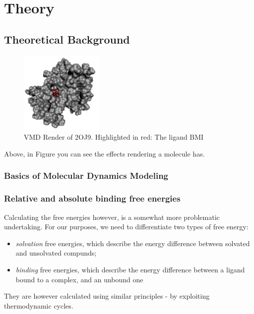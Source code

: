 \documentclass[oneside]{scrreprt}
\begin{document}
\chapter{Theory}

\section{Theoretical Background}



\begin{figure}[h]
\centering
 \includegraphics[height=4cm]{2oj9_render_complex.png} 

\caption{VMD Render of 2OJ9. Highlighted in red: The ligand BMI}
\label{fig:vmdrender}
\end{figure}
Above, in Figure  you can see the effects rendering a molecule has.


\subsection{Basics of Molecular Dynamics Modeling}

\subsection{Relative and absolute binding free energies}

Calculating the free energies however, is a somewhat more problematic undertaking. For our purposes, we need to differentiate two types of free energy:
\begin{itemize}
    \item \emph{solvation} free energies, which describe the energy difference between solvated and unsolvated compunds;
    \item \emph{binding} free energies, which describe the energy difference between a ligand bound to a complex, and an unbound one
\end{itemize}
They are however calculated using similar principles - by exploiting thermodynamic cycles.
\end{document}
